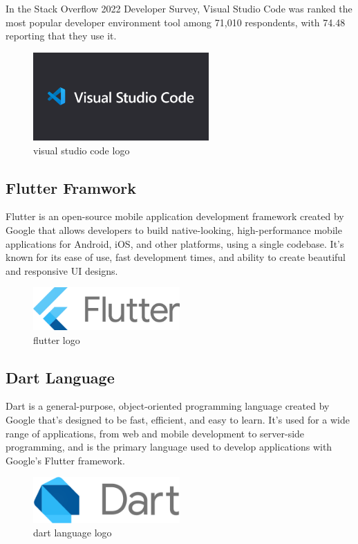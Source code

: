 In the Stack Overflow 2022 Developer Survey, Visual Studio Code was ranked the most popular developer environment tool among 71,010 respondents, with 74.48 reporting that they use it.\cite{vscode}

\begin{figure}[H]
    \centering
    \includegraphics[width=0.6\textwidth]{images/1_EOPCay4ML76rIUskd6ZwRg.png}
    \caption{visual studio code logo}
    \label{fig:figure4}
\end{figure}

\subsection{Flutter Framwork}
Flutter is an open-source mobile application development framework created by Google that allows developers to build native-looking, high-performance mobile applications for Android, iOS, and other platforms, using a single codebase. It's known for its ease of use, fast development times, and ability to create beautiful and responsive UI designs. \cite{flutter}
\begin{figure}[H]
    \centering
    \includegraphics[width=0.5\textwidth]{images/c823e53b3a1a7b0d36a9.png}
    \caption{flutter logo}
    \label{fig:figure4}
\end{figure}

\subsection{Dart Language}
Dart is a general-purpose, object-oriented programming language created by Google that's designed to be fast, efficient, and easy to learn. It's used for a wide range of applications, from web and mobile development to server-side programming, and is the primary language used to develop applications with Google's Flutter framework.\cite{dart}
\begin{figure}[H]
    \centering
    \includegraphics[width=0.5\textwidth]{images/Dart_programming_language_logo.svg.png}
    \caption{dart language logo}
    \label{fig:figure4}
\end{figure}

